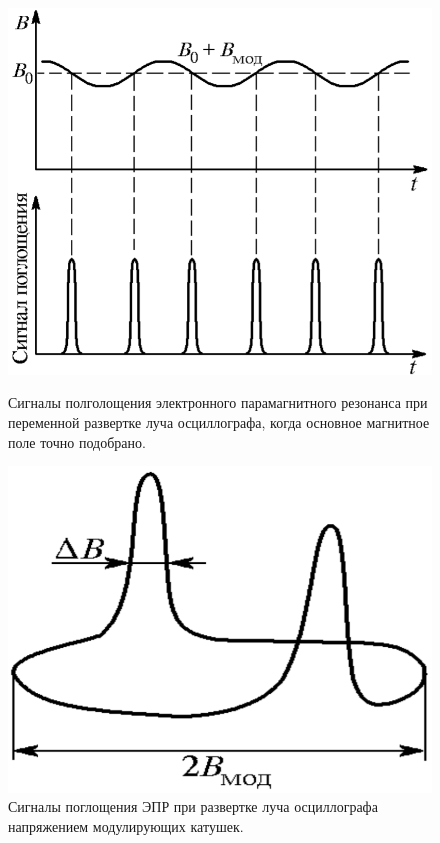 \documentclass[a4paper]{article}
\begin{document}
\begin{figure}[H]
    \begin{center}
    \begin{minipage}[h]{0.45\linewidth}
        \begin{center}
            \includegraphics[scale = 0.2]{pic3.png}
            \caption{Сигналы полголощения электронного парамагнитного резонанса при переменной развертке луча осциллографа, когда основное магнитное поле точно подобрано.}
            \label{p2}  
        \end{center}
    \end{minipage}
    \hfill
    \begin{minipage}[h]{0.45\linewidth}
        \begin{center}
            \includegraphics[scale = 0.2]{pic4.png}
            \caption{Сигналы поглощения ЭПР при развертке луча осциллографа напряжением модулирующих катушек.}
            \label{p3}
        \end{center}
    \end{minipage}
    \end{center}
    \end{figure}
\end{document}
